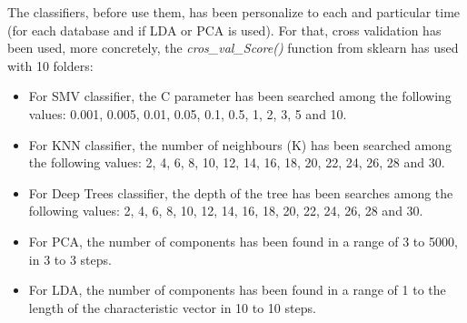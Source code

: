 The classifiers, before use them, has been personalize to each and particular time (for each database and if LDA or PCA is used). For that, cross validation has been used, more concretely, the \textit{cros\_val\_Score()} function from sklearn has used with 10 folders:
\begin{itemize}
\item For SMV classifier, the C parameter has been searched among the following values: 0.001, 0.005, 0.01, 0.05, 0.1, 0.5, 1, 2, 3, 5 and 10.
\item For KNN classifier, the number of neighbours (K) has been searched among the following values: 2, 4, 6, 8, 10, 12, 14, 16, 18, 20, 22, 24, 26, 28 and 30.
\item For Deep Trees classifier, the depth of the tree has been searches among the following values: 2, 4, 6, 8, 10, 12, 14, 16, 18, 20, 22, 24, 26, 28 and 30.
\item For PCA, the number of components has been found in a range of 3 to 5000, in 3 to 3 steps.
\item For LDA, the number of components has been found in a range of 1 to the length of the characteristic vector in 10 to 10 steps.
\end{itemize}

